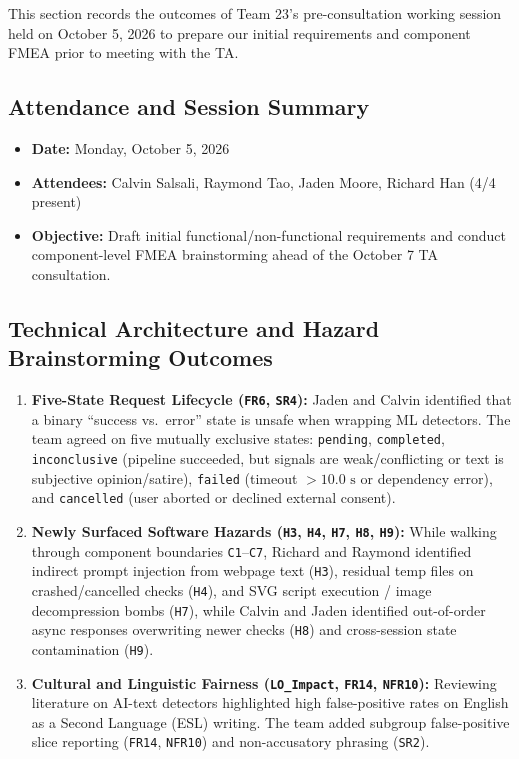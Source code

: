 \documentclass[11pt]{article}
\begin{document}
This section records the outcomes of Team 23's pre-consultation working session held on October 5, 2026 to prepare our initial requirements and component FMEA prior to meeting with the TA.

\subsection{Attendance and Session Summary}
\begin{itemize}[nosep, leftmargin=*]
    \item \textbf{Date:} Monday, October 5, 2026
    \item \textbf{Attendees:} Calvin Salsali, Raymond Tao, Jaden Moore, Richard Han (4/4 present)
    \item \textbf{Objective:} Draft initial functional/non-functional requirements and conduct component-level FMEA brainstorming ahead of the October 7 TA consultation.
\end{itemize}

\subsection{Technical Architecture and Hazard Brainstorming Outcomes}
\begin{enumerate}[leftmargin=*]
    \item \textbf{Five-State Request Lifecycle (\texttt{FR6}, \texttt{SR4}):} Jaden and Calvin identified that a binary ``success vs.\ error'' state is unsafe when wrapping ML detectors. The team agreed on five mutually exclusive states: \texttt{pending}, \texttt{completed}, \texttt{inconclusive} (pipeline succeeded, but signals are weak/conflicting or text is subjective opinion/satire), \texttt{failed} (timeout $>10.0\text{ s}$ or dependency error), and \texttt{cancelled} (user aborted or declined external consent).
    \item \textbf{Newly Surfaced Software Hazards (\texttt{H3}, \texttt{H4}, \texttt{H7}, \texttt{H8}, \texttt{H9}):} While walking through component boundaries \texttt{C1}--\texttt{C7}, Richard and Raymond identified indirect prompt injection from webpage text (\texttt{H3}), residual temp files on crashed/cancelled checks (\texttt{H4}), and SVG script execution / image decompression bombs (\texttt{H7}), while Calvin and Jaden identified out-of-order async responses overwriting newer checks (\texttt{H8}) and cross-session state contamination (\texttt{H9}).
    \item \textbf{Cultural and Linguistic Fairness (\texttt{LO\_Impact}, \texttt{FR14}, \texttt{NFR10}):} Reviewing literature on AI-text detectors \cite{Liang2023ESL} highlighted high false-positive rates on English as a Second Language (ESL) writing. The team added subgroup false-positive slice reporting (\texttt{FR14}, \texttt{NFR10}) and non-accusatory phrasing (\texttt{SR2}).
\end{enumerate}
\end{document}
